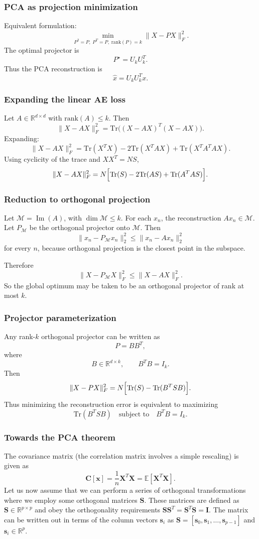 \documentclass{beamer}
\begin{document}
\begin{frame}
\frametitle{PCA as projection minimization}

Equivalent formulation:
\[
\min_{P^2=P,\; P^T=P,\; \mathrm{rank}(P)=k}\|X-PX\|_F^2.
\]
The optimal projector is
\[
P^\star = U_k U_k^T.
\]
Thus the PCA reconstruction is
\[
\hat x = U_k U_k^T x.
\]
\end{frame}

\begin{frame}
\frametitle{Expanding the linear AE loss}

Let \(A\in\mathbb{R}^{d\times d}\) with \(\mathrm{rank}(A)\le k\). Then
\[
\|X-AX\|_F^2
=
\mathrm{Tr}\bigl((X-AX)^T(X-AX)\bigr).
\]
Expanding:
\[
\|X-AX\|_F^2
=
\mathrm{Tr}(X^TX)-2\mathrm{Tr}(X^TAX)+\mathrm{Tr}(X^TA^TAX).
\]
Using cyclicity of the trace and \(XX^T = NS\),
\[
\|X-AX\|_F^2
=
N\Bigl[\mathrm{Tr}(S)-2\mathrm{Tr}(AS)+\mathrm{Tr}(A^TAS)\Bigr].
\]
\end{frame}

\begin{frame}
\frametitle{Reduction to orthogonal projection}

Let \(\mathcal{M}=\operatorname{Im}(A)\), with \(\dim \mathcal{M}\le k\).
For each \(x_n\), the reconstruction \(Ax_n\in \mathcal{M}\).
Let \(P_{\mathcal{M}}\) be the orthogonal projector onto \(\mathcal{M}\). Then
\[
\|x_n-P_{\mathcal{M}}x_n\|_2^2 \le \|x_n-Ax_n\|_2^2
\]
for every \(n\), because orthogonal projection is the closest point in the subspace.

Therefore
\[
\|X-P_{\mathcal{M}}X\|_F^2 \le \|X-AX\|_F^2.
\]
So the global optimum may be taken to be an orthogonal projector of rank at most \(k\).
\end{frame}

\begin{frame}
\frametitle{Projector parameterization}

Any rank-\(k\) orthogonal projector can be written as
\[
P = BB^T,
\]
where
\[
B\in\mathbb{R}^{d\times k},\qquad B^TB=I_k.
\]
Then
\[
\|X-PX\|_F^2
=
N\Bigl[\mathrm{Tr}(S)-\mathrm{Tr}(B^TSB)\Bigr].
\]
Thus minimizing the reconstruction error is equivalent to maximizing
\[
\mathrm{Tr}(B^TSB)
\quad \text{subject to} \quad B^TB=I_k.
\]
\end{frame}

\begin{frame}
\frametitle{Towards the PCA theorem}

The covariance matrix (the correlation matrix involves a simple rescaling) is given as
\[
\bm{C}[\bm{x}] = \frac{1}{n}\bm{X}^T\bm{X}= \mathbb{E}[\bm{X}^T\bm{X}].
\]
Let us now assume that we can perform a series of orthogonal transformations where we employ some orthogonal matrices $\bm{S}$.
These matrices are defined as $\bm{S}\in {\mathbb{R}}^{p\times p}$ and obey the orthogonality requirements $\bm{S}\bm{S}^T=\bm{S}^T\bm{S}=\bm{I}$. The matrix can be written out in terms of the column vectors $\bm{s}_i$ as $\bm{S}=[\bm{s}_0,\bm{s}_1,\dots,\bm{s}_{p-1}]$ and $\bm{s}_i \in {\mathbb{R}}^{p}$.
\end{frame}
\end{document}
